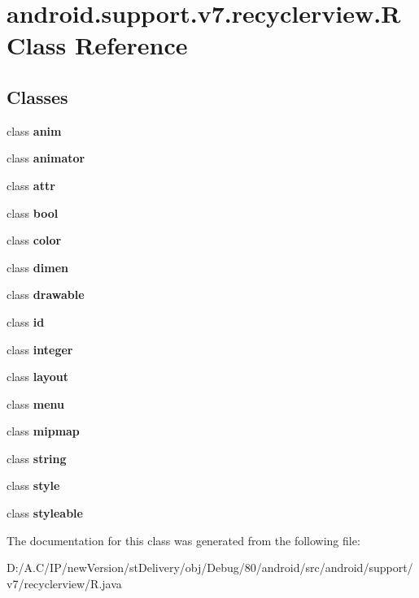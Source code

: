 \hypertarget{classandroid_1_1support_1_1v7_1_1recyclerview_1_1_r}{}\section{android.\+support.\+v7.\+recyclerview.\+R Class Reference}
\label{classandroid_1_1support_1_1v7_1_1recyclerview_1_1_r}
\subsection*{Classes}
\begin{DoxyCompactItemize}
\item 
class {\bfseries anim}
\item 
class {\bfseries animator}
\item 
class {\bfseries attr}
\item 
class {\bfseries bool}
\item 
class {\bfseries color}
\item 
class {\bfseries dimen}
\item 
class {\bfseries drawable}
\item 
class {\bfseries id}
\item 
class {\bfseries integer}
\item 
class {\bfseries layout}
\item 
class {\bfseries menu}
\item 
class {\bfseries mipmap}
\item 
class {\bfseries string}
\item 
class {\bfseries style}
\item 
class {\bfseries styleable}
\end{DoxyCompactItemize}


The documentation for this class was generated from the following file\+:\begin{DoxyCompactItemize}
\item 
D\+:/\+A.\+C/\+I\+P/new\+Version/st\+Delivery/obj/\+Debug/80/android/src/android/support/v7/recyclerview/R.\+java\end{DoxyCompactItemize}
